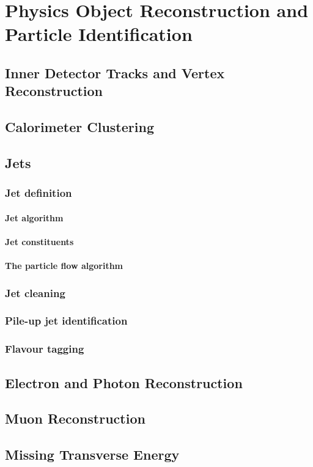 
\chapter{Physics Object Reconstruction and Particle Identification}
\label{chap:objects}

\section{Inner Detector Tracks and Vertex Reconstruction}

\section{Calorimeter Clustering}

\section{Jets}

\subsection{Jet definition}
\subsubsection{Jet algorithm}
\subsubsection{Jet constituents}
\subsubsection{The particle flow algorithm}

\subsection{Jet cleaning}
\subsection{Pile-up jet identification}
\subsection{Flavour tagging}

\section{Electron and Photon Reconstruction}
\label{sec:electron-photon-reconstruction}

\section{Muon Reconstruction}
\section{Missing Transverse Energy}



